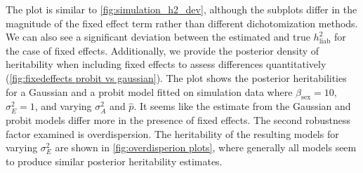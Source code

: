 The plot is similar to \autoref{fig:simulation_h2_dev}, although the subplots differ in the magnitude of the fixed effect term rather than different dichotomization methods. We can also see a significant deviation between the estimated and true $h^2_\text{liab}$ for the case of fixed effects. Additionally, we provide the posterior density of heritability when including fixed effects to assess differences quantitatively (\autoref{fig:fixedeffects probit vs gaussian}). The plot shows the posterior heritabilities for a Gaussian and a probit model fitted on simulation data where $\beta_{\text{sex}}=10$, $\sigma^2_E=1$, and varying $\sigma^2_A$ and $\hat p$. It seems like the estimate from the Gaussian and probit models differ more in the presence of fixed effects.
The second robustness factor examined is overdispersion. The heritability of the resulting models for varying $\sigma^2_E$ are shown in \autoref{fig:overdisperion plots}, where generally all models seem to produce similar posterior heritability estimates.

